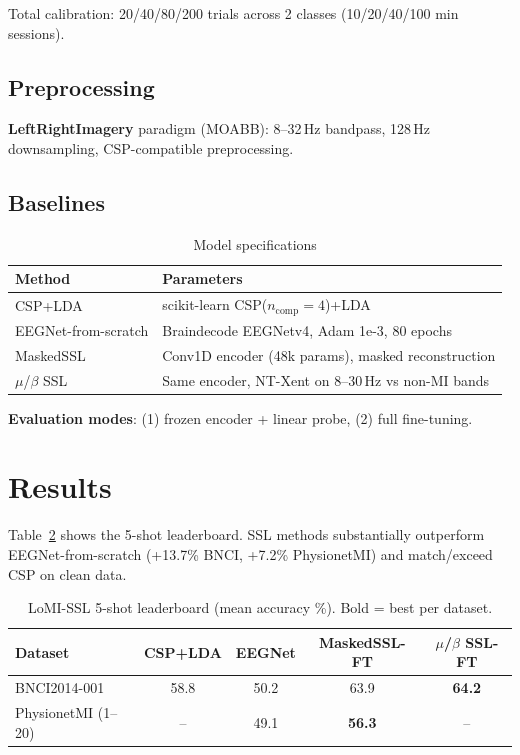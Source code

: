 \documentclass{iopjournal}
\begin{document}
Total calibration: 20/40/80/200 trials across 2 classes (10/20/40/100 min sessions).

\subsection{Preprocessing}

\textbf{LeftRightImagery} paradigm (MOABB): 8--32\,Hz bandpass, 128\,Hz downsampling, CSP-compatible preprocessing.

\subsection{Baselines}

\begin{table}
\centering
\caption{Model specifications}
\label{tab:models}
\begin{tabular}{ll}
\toprule
Method & Parameters \\
\midrule
CSP+LDA & scikit-learn CSP($n_\text{comp}=4$)+LDA \\
EEGNet-from-scratch & Braindecode EEGNetv4, Adam 1e-3, 80 epochs \\
MaskedSSL & Conv1D encoder (48k params), masked reconstruction \\
$\mu$/$\beta$ SSL & Same encoder, NT-Xent on 8--30\,Hz vs non-MI bands \\
\bottomrule
\end{tabular}
\end{table}

\textbf{Evaluation modes}: (1) frozen encoder + linear probe, (2) full fine-tuning.

\section{Results}

Table~\ref{tab:leaderboard} shows the 5-shot leaderboard. SSL methods substantially outperform EEGNet-from-scratch (+13.7\% BNCI, +7.2\% PhysionetMI) and match/exceed CSP on clean data.

\begin{table}
\centering
\caption{LoMI-SSL 5-shot leaderboard (mean accuracy \%). Bold = best per dataset.}
\label{tab:leaderboard}
\begin{tabular}{lcccc}
\toprule
Dataset & CSP+LDA & EEGNet & MaskedSSL-FT & $\mu$/$\beta$ SSL-FT \\
\midrule
BNCI2014-001 & 58.8 & 50.2 & 63.9 & \textbf{64.2} \\
PhysionetMI (1--20) & -- & 49.1 & \textbf{56.3} & -- \\
\bottomrule
\end{tabular}
\end{table}
\end{document}

